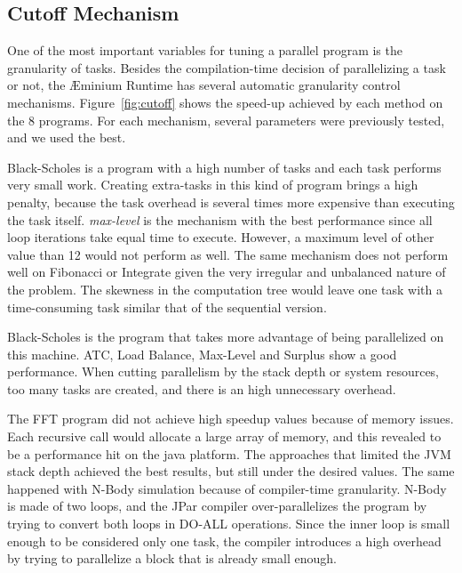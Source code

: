 \documentclass[smallextended]{svjour3}
\begin{document}
\subsection{Cutoff Mechanism}

One of the most important variables for tuning a parallel program is the granularity of tasks. Besides the compilation-time decision of parallelizing a task or not, the Æminium Runtime has several automatic granularity control mechanisms. Figure~\ref{fig:cutoff} shows the speed-up achieved by each method on the 8 programs. For each mechanism, several parameters were previously tested, and we used the best.


Black-Scholes is a program with a high number of tasks and each task performs very small work. Creating extra-tasks in this kind of program brings a high penalty, because the task overhead is several times more expensive than executing the task itself. \emph{max-level} is the mechanism with the best performance since all loop iterations take equal time to execute. However, a maximum level of other value than 12 would not perform as well. The same mechanism does not perform well on Fibonacci or Integrate given the very irregular and unbalanced nature of the problem. The skewness in the computation tree would leave one task with a time-consuming task similar that of the sequential version.


Black-Scholes is the program that takes more advantage of being parallelized on this machine. ATC, Load Balance, Max-Level and Surplus show a good performance. When cutting parallelism by the stack depth or system resources, too many tasks are created, and there is an high unnecessary overhead.


The FFT program did not achieve high speedup values because of memory issues. Each recursive call would allocate a large array of memory, and this revealed to be a performance hit on the java platform. The approaches that limited the JVM stack depth achieved the best results, but still under the desired values. The same happened with N-Body simulation because of compiler-time granularity. N-Body is made of two loops, and the JPar compiler over-parallelizes the program by trying to convert both loops in DO-ALL operations. Since the inner loop is small enough to be considered only one task, the compiler introduces a high overhead by trying to parallelize a block that is already small enough. 
\end{document}
